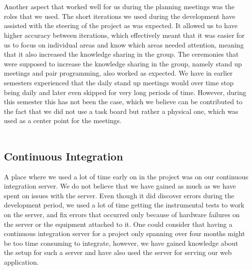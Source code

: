 \\\\
Another aspect that worked well for us during the planning meetings was the roles that we used. 
The short iterations we used during the development have assisted with the steering of the project as was expected. It allowed us to have higher accuracy between iterations, which effectively meant that it was easier for us to focus on individual areas and know which areas needed attention, meaning that it also increased the knowledge sharing in the group. The  ceremonies that were supposed to increase the knowledge sharing in the group, namely stand up meetings and pair programming, also worked as expected. We have in earlier semesters experienced that the daily stand up meetings would over time stop being daily and later even skipped for very long periods of time. However, during this semester this has not been the case, which we believe can be contributed to the fact that we did not use a task board but rather a physical one, which was used as a center point for the meetings. 
\\\\

\subsection{Continuous Integration}
A place where we used a lot of time early on in the project was on our continuous integration server. We do not believe that we have gained as much as we have spent on issues with the server. Even though it did discover errors during the development period, we used a lot of time getting the instrumental tests to work on the server, and fix errors that occurred only because of hardware failures on the server or the equipment attached to it. One could consider that having a continuous integration server for a project only spanning over four months might be too time consuming to integrate, however, we have gained knowledge about the setup for such a server and have also used the server for serving our web application. 







